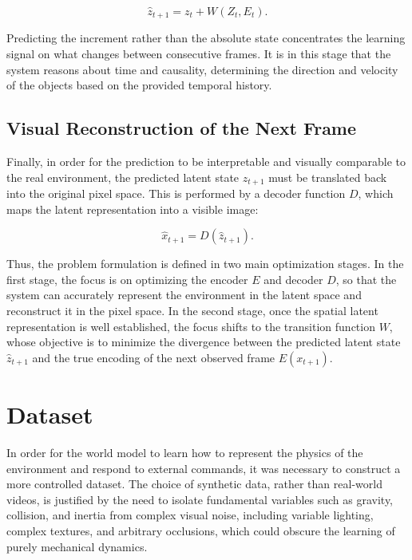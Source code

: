 \documentclass[conference]{IEEEtran}
\begin{document}
\begin{equation}
    \hat{z}_{t+1} = z_t + W(Z_t, E_t).
\end{equation}

Predicting the increment rather than the absolute state concentrates the learning signal on what changes between consecutive frames. It is in this stage that the system reasons about time and causality, determining the direction and velocity of the objects based on the provided temporal history.

\subsection{Visual Reconstruction of the Next Frame}

Finally, in order for the prediction to be interpretable and visually comparable to the real environment, the predicted latent state \(\hat{z}_{t+1}\) must be translated back into the original pixel space. This is performed by a decoder function \(D\), which maps the latent representation into a visible image:

\begin{equation}
    \hat{x}_{t+1} = D(\hat{z}_{t+1}).
\end{equation}

Thus, the problem formulation is defined in two main optimization stages. In the first stage, the focus is on optimizing the encoder \(E\) and decoder \(D\), so that the system can accurately represent the environment in the latent space and reconstruct it in the pixel space. In the second stage, once the spatial latent representation is well established, the focus shifts to the transition function \(W\), whose objective is to minimize the divergence between the predicted latent state \(\hat{z}_{t+1}\) and the true encoding of the next observed frame \(E(x_{t+1})\).

\section{Dataset}
\label{sec:dataset}

In order for the world model to learn how to represent the physics of the environment and respond to external commands, it was necessary to construct a more controlled dataset. The choice of synthetic data, rather than real-world videos, is justified by the need to isolate fundamental variables such as gravity, collision, and inertia from complex visual noise, including variable lighting, complex textures, and arbitrary occlusions, which could obscure the learning of purely mechanical dynamics.
\end{document}
